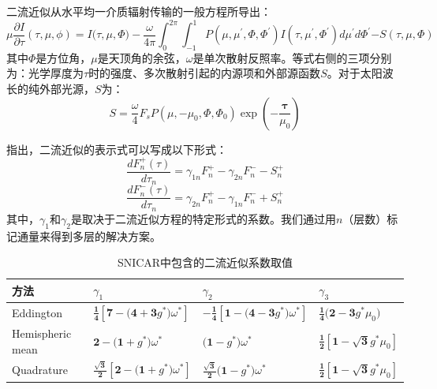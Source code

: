 二流近似从水平均一介质辐射传输的一般方程所导出：
%
\begin{equation}
\mu\frac{\partial {I}}{\partial\tau}(\tau,\mu,\phi){= I(\tau,}\mu,\Phi) - \frac{\omega}{{4}{\pi}}\int_{{0}}^{{2}\pi}{\int_{- 1}^{1}{P\left( \mu,\mu^{'},\Phi,\Phi^{'} \right)}}I\left( \tau,\mu^{'},\Phi^{'} \right){d}\mu^{'}d\Phi^{'}{- S}\left( \tau,\mu,\Phi \right)
\end{equation}
%
其中\(\Phi\)是方位角，\(\mu\)是天顶角的余弦，\(\omega\)是单次散射反照率。等式右侧的三项分别为：光学厚度为\(\tau\)时的强度、多次散射引起的内源项和外部源函数$S$。对于太阳波长的纯外部光源，$S$为：
%
\begin{equation}
S = \frac{\omega}{4}F_{s}P\left( \mu,{- \mu}_{0},\Phi,\Phi_{0} \right)\exp\left( -\frac{\mathbf{\tau}}{\mu_{0}} \right)
\end{equation}

\citet{meador1980TwostreamApproximationsRadiative}指出，二流近似的表示式可以写成以下形式：
\begin{equation}
\frac{dF_{n}^{+}(\tau)}{d\tau_{n}} = \gamma_{1n}F_{n}^{+} - \gamma_{2n}F_{n}^{-} - S_{n}^{+}
\end{equation}
\begin{equation}
\frac{dF_{n}^{-}(\tau)}{d\tau_{n}} = \gamma_{2n}F_{n}^{+} - \gamma_{1n}F_{n}^{-} + S_{n}^{+}
\end{equation}
其中，\(\gamma_{1}\)和\(\gamma_{2}\)是取决于二流近似方程的特定形式的系数。我们通过用$n$（层数）标记通量来得到多层的解决方案。

\begin{table}[htbp]
\centering
\caption{SNICAR中包含的二流近似系数取值}
\label{tab:SNICAR二流近似系数}
\begin{tabular}{llll}
\toprule
方法 & $\gamma_{1}$ & $\gamma_{2}$ & $\gamma_{3}$ \\ \midrule
Eddington &
\(\frac{\mathbf{1}}{\mathbf{4}}\left\lbrack \mathbf{7 - (4 + 3}g^{*})\omega^{*} \right\rbrack\)
&
\(- \frac{\mathbf{1}}{\mathbf{4}}\left\lbrack \mathbf{1 - (4 - 3}g^{*})\omega^{*} \right\rbrack\)
& \(\frac{\mathbf{1}}{\mathbf{4}}\mathbf{(2 - 3}g^{*}\mu_{0})\) \\
Hemispheric mean & \(\mathbf{2 - (1 +}g^{*})\omega^{*}\) &
\(\mathbf{(1 -}g^{*})\omega^{*}\) &
\(\frac{\mathbf{1}}{\mathbf{2}}\left\lbrack \mathbf{1 -}\sqrt{\mathbf{3}}g^{*}\mu_{0} \right\rbrack\) \\
Quadrature &
\(\frac{\sqrt{\mathbf{3}}}{\mathbf{2}}\left\lbrack \mathbf{2 - (1 +}g^{*})\omega^{*} \right\rbrack\)
& \(\frac{\sqrt{\mathbf{3}}}{\mathbf{2}}\mathbf{(1 -}g^{*})\omega^{*}\)
&
\(\frac{\mathbf{1}}{\mathbf{2}}\left\lbrack \mathbf{1 -}\sqrt{\mathbf{3}}g^{*}\mu_{0} \right\rbrack\) \\ \bottomrule
\end{tabular}
\end{table}

